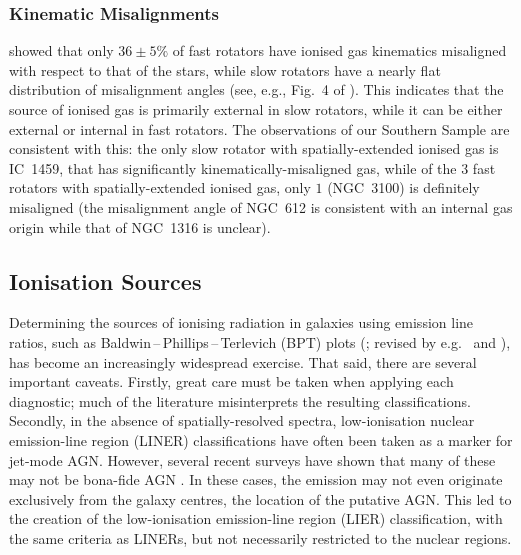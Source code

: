 \documentclass[a4paper,fleqn,usenatbib]{mnras}
\begin{document}
\subsubsection{Kinematic Misalignments}
\label{subsec:kinmis}

\citet{Davis2011a} showed that only $36\pm5\%$ of fast rotators have
ionised gas kinematics misaligned with respect to that of the stars,
while slow rotators have a nearly flat distribution of misalignment
angles (see, e.g., Fig.~4 of \citealt{Davis2011a}). This indicates
that the source of ionised gas is primarily external in slow rotators,
while it can be either external or internal in fast rotators. The
observations of our Southern Sample are consistent with this: the only
slow rotator with spatially-extended ionised gas is IC~1459, that has
significantly kinematically-misaligned gas, while of the $3$ fast
rotators with spatially-extended ionised gas, only $1$ (NGC~3100) is
definitely misaligned (the misalignment angle of NGC~612 is consistent
with an internal gas origin while that of NGC~1316 is unclear).
             
\subsection{Ionisation Sources}
\label{subsec:Diagnostics}

Determining the sources of ionising radiation in galaxies using
emission line ratios, such as Baldwin\,--\,Phillips\,--\,Terlevich
(BPT) plots (\citealt{Baldwin1981}; revised by e.g.\
\citealt{Kewley2001, Kewley2006} and \citealt{Kauffmann2003a}), has
become an increasingly widespread exercise. That said, there are
several important caveats. Firstly, great care must be taken when
applying each diagnostic; much of the literature misinterprets the
resulting classifications. Secondly, in the absence of
spatially-resolved spectra, low-ionisation nuclear emission-line
region (LINER) classifications have often been taken as a marker for
jet-mode AGN. However, several recent surveys have shown that many of
these may not be bona-fide AGN \citep[e.g.][]{Sarzi2005, Sarzi2010,
  Singh2013, Belfiore2016a}. In these cases, the emission may not even
originate exclusively from the galaxy centres, the location of the
putative AGN. This led to the creation of the low-ionisation
emission-line region (LIER) classification, with the same criteria as
LINERs, but not necessarily restricted to the nuclear regions.
\end{document}
